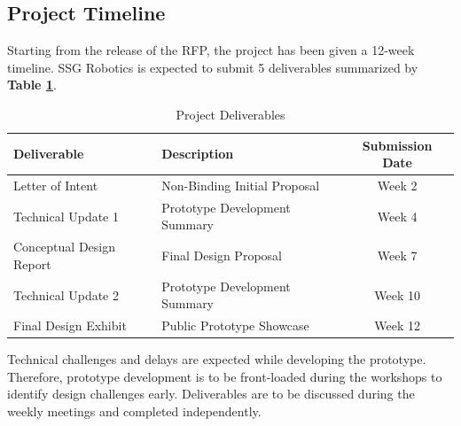 \documentclass[letterpaper,fleqn,oneside]{template}
\begin{document}
\subsection{Project Timeline}

Starting from the release of the RFP, the project has been given a 12-week timeline. SSG Robotics is expected to submit 5 deliverables summarized by \textbf{Table \ref{tbl:deliverables}}.



\begin{table}[htbp]
  \caption{Project Deliverables}
  \begin{center}
    \begin{tabular}{llc}
      \toprule
      \bf Deliverable & \bf Description & \bf Submission Date \\ \midrule
      Letter of Intent & Non-Binding Initial Proposal & Week 2 \\
      Technical Update 1 & Prototype Development Summary & Week 4 \\
      Conceptual Design Report & Final Design Proposal & Week 7 \\
      Technical Update 2 & Prototype Development Summary & Week 10 \\
      Final Design Exhibit & Public Prototype Showcase & Week 12 \\
      \bottomrule
    \end{tabular}
  \end{center}
  \label{tbl:deliverables}
\end{table}%

Technical challenges and delays are expected while developing the prototype. Therefore, prototype development is to be front-loaded during the workshops to identify design challenges early. Deliverables are to be discussed during the weekly meetings and completed independently. 


\end{document}
